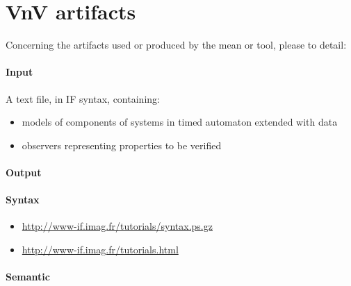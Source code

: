 \section{VnV artifacts}


Concerning the artifacts used or produced by the mean or tool, please to detail:

\paragraph{Input}
    
	A text file, in IF syntax, containing:
\begin{itemize}
	\item models of components of systems in timed automaton extended with data
	\item observers representing properties to be verified
\end{itemize}
    
    
\paragraph{Output}
    

    
\paragraph{Syntax}
    
	\begin{itemize}
		\item \url{http://www-if.imag.fr/tutorials/syntax.ps.gz}
		\item \url{http://www-if.imag.fr/tutorials.html}
	\end{itemize}
    
    
\paragraph{Semantic}

